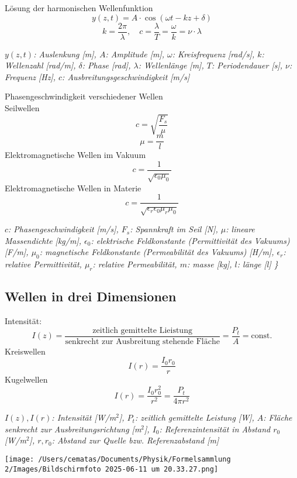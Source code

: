 \documentclass[a4paper,10pt]{article}
\newenvironment{displayformula}
{
	\begin{framed}
		\color{formulaColor}
	}
	{\end{framed}}
\newcommand{\formulalegend}[1]{%
	\par\vspace{0.5ex}%
	{{\color{legendColor}\RaggedRight\small\textit{#1}}}%
	\par\vspace{1.5ex}%
}
\begin{document}
\begin{displayformula}
	Lösung der harmonischen Wellenfunktion
	\[
	y(z, t) = A \cdot \cos(\omega t - kz + \delta)
	\]
	\[
	k = \frac{2\pi}{\lambda}, \quad c = \frac{\lambda}{T} = \frac{\omega}{k} = \nu \cdot \lambda
	\]
\end{displayformula}
\formulalegend{
	\( y(z,t) \): Auslenkung [m], \( A \): Amplitude [m], \( \omega \): Kreisfrequenz [rad/s], \( k \): Wellenzahl [rad/m], \( \delta \): Phase [rad], \( \lambda \): Wellenlänge [m], \( T \): Periodendauer [s], \( \nu \): Frequenz [Hz], \( c \): Ausbreitungsgeschwindigkeit [m/s]
}


\begin{displayformula}
	Phasengeschwindigkeit verschiedener Wellen \\ 
	Seilwellen
	\[
	c = \sqrt{\frac{F_s}{\mu}}
	\]
		\[
	\mu = \frac{m}{l}
	\]
	Elektromagnetische Wellen im Vakuum
	\[
	c = \frac{1}{\sqrt{\epsilon_0 \mu_0}}
	\]
	Elektromagnetische Wellen in Materie
	\[
	c = \frac{1}{\sqrt{\epsilon_r \epsilon_0 \mu_r \mu_0}}
	\]
\end{displayformula}
\formulalegend{
	\( c \): Phasengeschwindigkeit [m/s], 
	\( F_s \): Spannkraft im Seil [N], 
	\( \mu \): lineare Massendichte [kg/m], 
	\( \epsilon_0 \): elektrische Feldkonstante (Permittivität des Vakuums) [F/m], 
	\( \mu_0 \): magnetische Feldkonstante (Permeabilität des Vakuums) [H/m], 
	\( \epsilon_r \): relative Permittivität, 
	\( \mu_r \): relative Permeabilität,
	\(m\): masse [kg],
	\(l\): länge [l]
	\}
}

\subsection{Wellen in drei Dimensionen}
\begin{displayformula}
	Intensität:
	\[
	I(z) = \frac{\text{zeitlich gemittelte Lieistung}}{\text{senkrecht zur Ausbreitung stehende Fläche}} = \frac{P_t}{A} = \text{const.}
	\]
	Kreiswellen
	\[
	I(r) = \frac{I_0r_0}{r}
	\]
	Kugelwellen
	\[
	I(r) = \frac{I_0r_0^2}{r^2} = \frac{P_t}{4\pi r^2}
	\]
\end{displayformula}
\formulalegend{
	\( I(z), I(r) \): Intensität [W/m\(^2\)], 
	\( P_t \): zeitlich gemittelte Leistung [W], 
	\( A \): Fläche senkrecht zur Ausbreitungsrichtung [m\(^2\)], 
	\( I_0 \): Referenzintensität in Abstand \( r_0 \) [W/m\(^2\)], 
	\( r, r_0 \): Abstand zur Quelle bzw. Referenzabstand [m]
}
\texttt{[image: /Users/cematas/Documents/Physik/Formelsammlung 2/Images/Bildschirmfoto 2025-06-11 um 20.33.27.png]}
\end{document}
